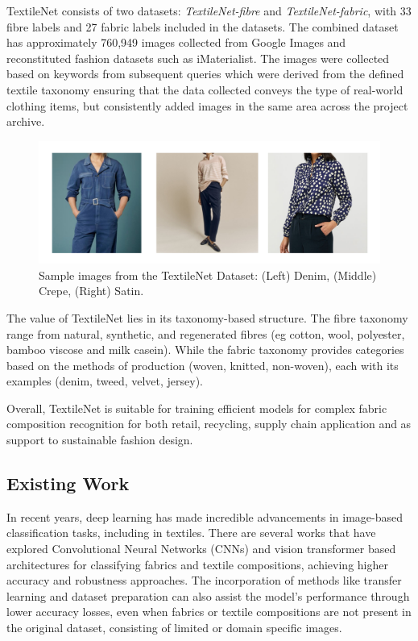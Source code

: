 TextileNet consists of two datasets: \textit{TextileNet-fibre} and \textit{TextileNet-fabric}, with 33 fibre labels and 27 fabric labels included in the datasets. The combined dataset has approximately 760,949 images collected from Google Images and reconstituted fashion datasets such as iMaterialist. The images were collected based on keywords from subsequent queries which were derived from the defined textile taxonomy ensuring that the data collected conveys the type of real-world clothing items, but consistently added images in the same area across the project archive.

\begin{figure}[H]
    \centering
    \begin{minipage}{0.8\linewidth}
        \includegraphics[width=\linewidth]{images/TextileNetDataset.png}
    \end{minipage}
    \caption[Sample images from the TextileNet Dataset]{Sample images from the TextileNet Dataset: (Left) Denim, (Middle) Crepe, (Right) Satin.}
\end{figure}

The value of TextileNet lies in its taxonomy-based structure. The fibre taxonomy range from natural, synthetic, and regenerated fibres (eg cotton, wool, polyester, bamboo viscose and milk casein). While the fabric taxonomy provides categories based on the methods of production (woven, knitted, non-woven), each with its examples (denim, tweed, velvet, jersey).

Overall, TextileNet is suitable for training efficient models for complex fabric composition recognition for both retail, recycling, supply chain application and as support to sustainable fashion design.

\subsection{Existing Work}

In recent years, deep learning has made incredible advancements in image-based classification tasks, including in textiles. There are several works that have explored Convolutional Neural Networks (CNNs) and vision transformer based architectures for classifying fabrics and textile compositions, achieving higher accuracy and robustness approaches. The incorporation of methods like transfer learning and dataset preparation can also assist the model's performance through lower accuracy losses, even when fabrics or textile compositions are not present in the original dataset, consisting of limited or domain specific images. 

